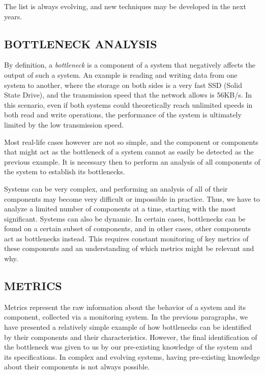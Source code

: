 The list is always evolving, and new techniques may be developed in the next years.

\subsection{BOTTLENECK ANALYSIS}

By definition, a \textit{bottleneck} is a component of a system that negatively affects the output of such a system.
An example is reading and writing data from one system to another, where the storage on both sides is a very fast SSD (Solid State Drive), and the transmission speed that the network allows is 56KB/s.
In this scenario, even if both systems could theoretically reach unlimited speeds in both read and write operations, the performance of the system is ultimately limited by the low transmission speed.

Most real-life cases however are not so simple, and the component or components that might act as the bottleneck of a system cannot as easily be detected as the previous example.
It is necessary then to perform an analysis of all components of the system to establish its bottlenecks.

Systems can be very complex, and performing an analysis of all of their components may become very difficult or impossible in practice.
Thus, we have to analyze a limited number of components at a time, starting with the most significant.
Systems can also be dynamic.
In certain cases, bottlenecks can be found on a certain subset of components, and in other cases, other components act as bottlenecks instead.
This requires constant monitoring of key metrics of these components and an understanding of which metrics might be relevant and why.

\subsection{METRICS}

Metrics represent the raw information about the behavior of a system and its component, collected via a monitoring system.
In the previous paragraphs, we have presented a relatively simple example of how bottlenecks can be identified by their components and their characteristics.
However, the final identification of the bottleneck was given to us by our pre-existing knowledge of the system and its specifications.
In complex and evolving systems, having pre-existing knowledge about their components is not always possible.


